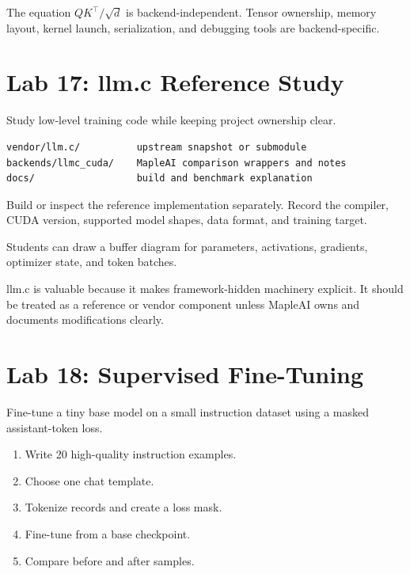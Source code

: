  The equation \(QK^\top/\sqrt{d}\) is backend-independent. Tensor ownership, memory layout, kernel launch, serialization, and debugging tools are backend-specific.

\section{Lab 17: llm.c Reference Study}

 Study low-level training code while keeping project ownership clear.


\begin{lstlisting}
vendor/llm.c/          upstream snapshot or submodule
backends/llmc_cuda/    MapleAI comparison wrappers and notes
docs/                  build and benchmark explanation
\end{lstlisting}

Build or inspect the reference implementation separately. Record the compiler, CUDA version, supported model shapes, data format, and training target.

 Students can draw a buffer diagram for parameters, activations, gradients, optimizer state, and token batches.

 llm.c is valuable because it makes framework-hidden machinery explicit. It should be treated as a reference or vendor component unless MapleAI owns and documents modifications clearly.

\section{Lab 18: Supervised Fine-Tuning}

 Fine-tune a tiny base model on a small instruction dataset using a masked assistant-token loss.


\begin{enumerate}
  \item Write 20 high-quality instruction examples.
  \item Choose one chat template.
  \item Tokenize records and create a loss mask.
  \item Fine-tune from a base checkpoint.
  \item Compare before and after samples.
\end{enumerate}

